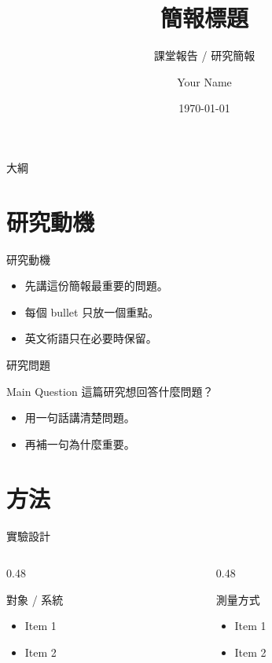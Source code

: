 \documentclass[aspectratio=169]{ctexbeamer}
\title{簡報標題}
\subtitle{課堂報告 / 研究簡報}
\author{Your Name}
\institute{Course / Department}
\date{\today}
\begin{document}
\frame{\titlepage}

\begin{frame}{大綱}
\tableofcontents
\end{frame}

\section{研究動機}

\begin{frame}{研究動機}
\begin{itemize}
  \item 先講這份簡報最重要的問題。
  \item 每個 bullet 只放一個重點。
  \item 英文術語只在必要時保留。
\end{itemize}
\end{frame}

\begin{frame}{研究問題}
\begin{block}{Main Question}
這篇研究想回答什麼問題？
\end{block}

\begin{itemize}
  \item 用一句話講清楚問題。
  \item 再補一句為什麼重要。
\end{itemize}
\end{frame}

\section{方法}

\begin{frame}{實驗設計}
\begin{columns}[T]
  \begin{column}{0.48\textwidth}
    \begin{block}{對象 / 系統}
    \begin{itemize}
      \item Item 1
      \item Item 2
    \end{itemize}
    \end{block}
  \end{column}
  \begin{column}{0.48\textwidth}
    \begin{block}{測量方式}
    \begin{itemize}
      \item Item 1
      \item Item 2
    \end{itemize}
    \end{block}
  \end{column}
\end{columns}
\end{frame}
\end{document}
